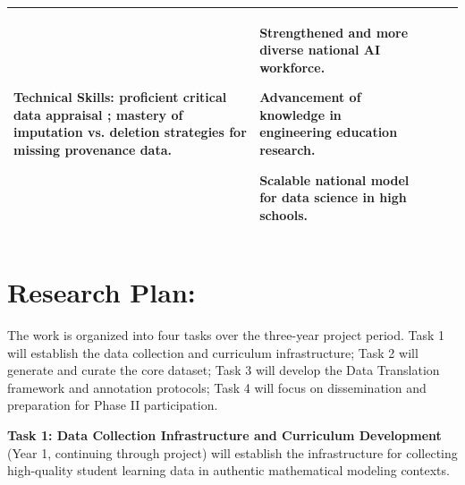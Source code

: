 \documentclass[11pt]{article}
\begin{document}
\begin{table}[H]
\begin{tabularx}{\textwidth}{|X|X|X|X|X|}
        \vspace{0.2cm}
        
        \textbf{Technical Skills:} proficient critical data appraisal \cite{Kapur02042016}; mastery of imputation vs. deletion strategies for missing provenance data.
        & 
        Strengthened and more diverse national AI workforce.
        
        \vspace{0.2cm}

        Advancement of knowledge in engineering education research.
        
        \vspace{0.2cm}
        
        Scalable national model for data science in high schools.
        \\ 
        \hline
    \end{tabularx}
\end{table}

\section{Research Plan:} 

The work is organized into four tasks over the three-year project period.
Task 1 will establish the data collection and curriculum infrastructure; 
Task 2 will generate and curate the core dataset; 
Task 3 will develop the Data Translation framework and annotation protocols;
Task 4 will focus on dissemination and preparation for Phase II participation.

\vspace{-0.2cm}
\begin{tcolorbox}[colback=mycmykcolor, colframe=black, boxrule=1pt, coltext=black]
\vspace{-0.2cm}
\textbf{Task 1: Data Collection Infrastructure and Curriculum Development}
(Year 1, continuing through project) will establish the infrastructure for collecting high-quality student learning data in authentic mathematical modeling contexts.
\vspace{-0.2cm}
\end{tcolorbox}
\vspace{-0.1cm}
\end{document}
